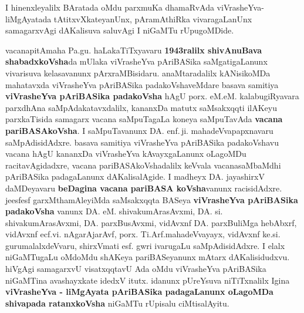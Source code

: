 \medskip

I hinenxleyalilx BAratada oMdu parxmuKa dhamaRvAda viVrasheYva-liMgAyatada tAtitxvXkateyanUnx, pAramAthiRka vivara\-gaLanUnx samagarxvAgi dAKalisuva saluvAgi I niGaMTu rUpugoMDide. 

\medskip

vacanapitAmaha Pa.gu. haLakaTiTxyavaru \textbf{1943ralilx shivAnuBava shabadxkoVsha}da mUlaka viVrasheYva pAriBASika saMgati\-gaLanunx vivarisuva kelasavanunx pArxraMBisidaru. anaMtaradalilx kANisikoMDa mahatavxda viVrasheYva pAriBASika padakoVshaveMdare basava samitiya \textbf{viVrasheYva pAriBASika padakoVsha} hAgU porx. eM.eM. kalabugiRyavara parxdhAna saMpAdakatavx\-dalilx, kananxDa matutx saMsakxqqti ilAKeyu parxkaTisida samagarx vacana saMpuTagaLa koneya saMpuTavAda \textbf{vacana pariBASA\-koVsha}. I saMpuTavanunx DA. enf.\,ji. mahadeVvapapxnavaru saMpAdisidAdxre. basava samitiya viVrasheYva pAriBASika padakoVshavu vacana hAgU kananxDa \hbox{viVrasheYva} kAvayxgaLanunx oLagoMDu racitavAgidadxre, vacana pariBASAkoVshadalilx keVvala vacanasaMbaMdhi pAriBASika padagaLanunx dAKalisalAgide. I madheyx DA. jayashirxV daMDeyavaru \textbf{beDagina vacana pariBASA koVsha}vanunx racisidAdxre. jeesfesf garxMthamAleyiMda saMsakxqqta BASeya \textbf{viVrasheYva pAriBASika padakoVsha} vanunx DA. eM. shivakumArasAvxmi, DA. si. shiva\-kumArasAvxmi, DA. parxBusAvxmi, vidAvxnf DA. parxBuliMga hebAbxrf, vidAvxnf ecf.vi. nAgarAjarAvf, porx. Ti.Arf.\break mahadeVvayayx, vidAvxnf ke.si. gurumalalxdeVvaru, shirxVmati esf. gwri ivarugaLu saMpAdi\-sidAdxre. I elalx niGaMTugaLu oMdoMdu shAKeya pariBASeyanunx mAtarx dAKalisidudxvu. hiVgAgi samagarxvU visatxqqtavU Ada oMdu viVrasheYva pAriBASika niGaMTina avashayxkate idedxV itutx. idanunx pUreYsuva niTiTxnalilx Igina \textbf{viVrasheYva - liMgAyata pAriBASika padagaLanunx oLagoMDa shivapada ratanxkoVsha} niGaMTu rUpisalu ciMtisalAyitu.

\medskip

